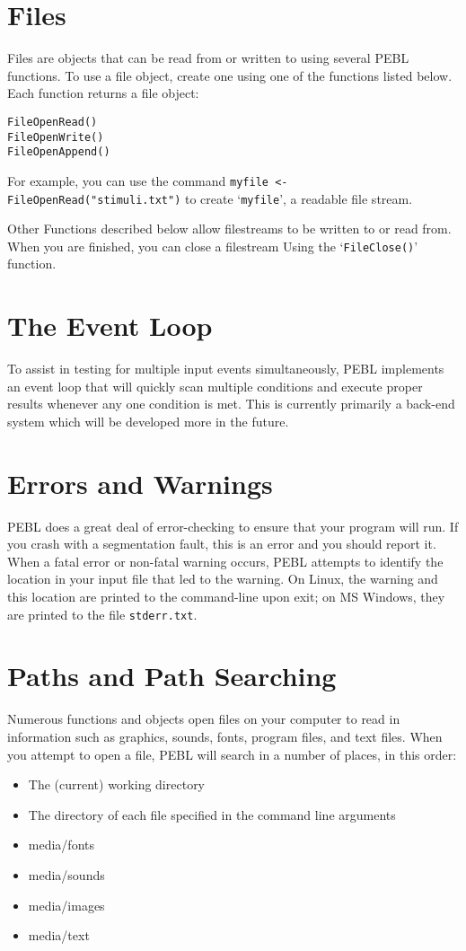 \section{Files}

Files are objects that can be read from or written to using several PEBL functions. To use a file object, create one using one of the functions 
listed below.  Each function returns a file object:
\begin{verbatim}
FileOpenRead()
FileOpenWrite()
FileOpenAppend()
\end{verbatim}

For example, you can use the command \texttt{myfile <- FileOpenRead("stimuli.txt")} to create `\texttt{myfile}', a readable file stream.

Other Functions described below allow filestreams to be written to 
or read from.  When you are finished, you can close a filestream 
Using the `\texttt{FileClose()}' function.


\section{The Event Loop}

To assist in testing for multiple input events simultaneously, 
PEBL implements an event loop that will quickly scan multiple conditions
and execute proper results whenever any one condition is met.  
This is currently primarily a back-end system 
which will be developed more in the future.


\section{Errors and Warnings}

PEBL does a great deal of error-checking to ensure that your program
will run.  If you crash with a segmentation fault, this is an error
and you should report it.  When a fatal error or non-fatal warning occurs, PEBL attempts to identify the location in your input file that led to 
the warning.  On Linux, the warning and this location are printed to the command-line upon exit; on MS Windows, they are printed to the file \texttt{stderr.txt}.


\section{Paths and Path Searching}

Numerous functions and objects open files on your computer to read in
information such as graphics, sounds, fonts, program files, and text files.  When you attempt to open a file, PEBL will search in a number of places, 
in this order:
\begin{itemize}
\item
The (current) working directory
\item
The directory of each file specified in the command line arguments
\item
media/fonts
\item
media/sounds
\item
media/images
\item
media/text
\end{itemize}
  
